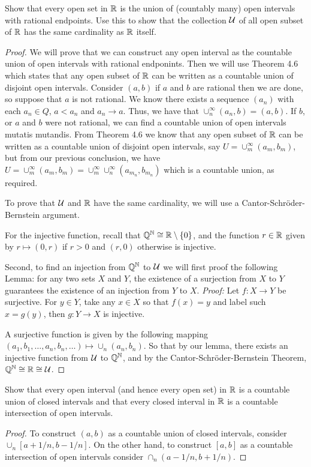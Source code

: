 \begin{exercise}{7}
Show that every open set in $\mathbb{R}$ is the union of (countably many) open intervals with rational endpoints. 
Use this to show that the collection $\mathcal{U}$ of all open subset of $\mathbb{R}$ has the same cardinality as $\mathbb{R}$ itself.
\end{exercise}
\begin{proof}
We will prove that we can construct any open interval as the countable union of open intervals with rational endponints. 
Then we will use Theorem 4.6 which states that any open subset of $\mathbb{R}$ can be written as a countable union of disjoint open intervals.
Consider $(a,b)$ if $a$ and $b$ are rational then we are done, so suppose that $a$ is not rational.
We know there exists a sequence $(a_n)$ with each $a_n\in Q$, $a<a_n$ and $a_n\to a$.
Thus, we have that $\cup_n^\infty (a_n,b) =(a,b)$.
If $b$, or $a$ and $b$ were not rational, we can find a countable union of open intervals mutatis mutandis.
From Theorem 4.6 we know that any open subset of $\mathbb{R}$ can be written as a countable union of disjoint open intervals, say $U=\cup_m^\infty (a_m,b_m)$, but from our previous conclusion, we have $U =\cup_m^\infty (a_m,b_m) =\cup_m^\infty \cup_n^\infty(a_{m_n},b_{m_n})$ which is a countable union, as required.

To prove that $\mathcal{U}$ and $\mathbb{R}$ have the same cardinality, we will use a Cantor-Schr\"oder-Bernstein argument.

For the injective function, recall that $\mathbb{Q}^{\mathbb{N}}\cong\mathbb{R}\setminus\{0\}$, and the function $r\in\mathbb{R}$ given by $r\mapsto (0,r)$ if $r>0$ and $(r,0)$ otherwise is injective.

Second, to find an injection from $\mathbb{Q}^{\mathbb{N}}$ to $\mathcal{U}$ we will first proof the following Lemma: 
for any two sets $X$ and $Y$, the existence of a surjection from $X$ to $Y$ guarantees the existence of an injection from $Y$ to $X$.
\textit{Proof:} Let $f:X\to Y$ be surjective.
For $y\in Y$, take any $x\in X$ so that $f(x)=y$ and label such $x=g(y)$, then $g:Y\to X$ is injective.

A surjective function is given by the following mapping $(a_1,b_1,\dots,a_n,b_n,\dots)\mapsto \cup_n (a_n,b_n)$.
So that by our lemma, there exists an injective function from $\mathcal{U}$ to $\mathbb{Q}^{\mathbb{N}}$, and by the Cantor-Schr\"oder-Bernstein Theorem, $\mathbb{Q}^{\mathbb{N}}\cong\mathbb{R}\cong\mathcal{U}$.
\end{proof} 

\begin{exercise}{8}
Show that every open interval (and hence every open set) in $\mathbb{R}$ is a countable union of closed intervals and that every closed interval in $\mathbb{R}$ is a countable intersection of open intervals.
\end{exercise}
\begin{proof}
To construct $(a,b)$ as a countable union of closed intervals, consider $\cup_n [a+1/n, b-1/n]$. 
On the other hand, to construct $[a,b]$ as a countable intersection of open intervals consider $\cap_n (a-1/n,b+1/n)$.
\end{proof} 

